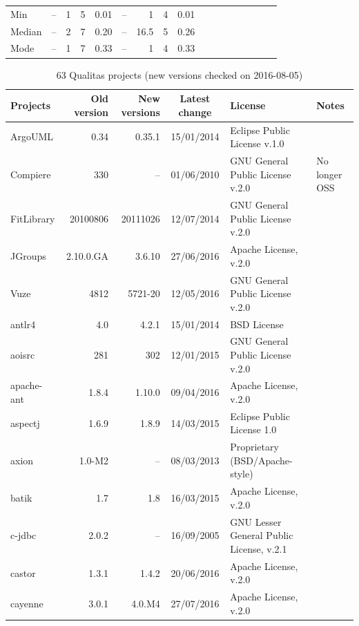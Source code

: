 \documentclass{IEEEtran}
\begin{document}
\begin{table}[h]
{\begin{tabular}{l|r|r|r|r|r|r|r|r|r|r|r|r|r|r|r|r}
			Min 	& -- 	& 1 	& 5 	& 0.01 	& -- 	& 1 		& 4 	& 0.01 \\ %
			Median 	& -- 	& 2 	& 7 	& 0.20 	& -- 	& 16.5 		& 5 	& 0.26 \\ %
			Mode 	& -- 	& 1 	& 7 	& 0.33 	& -- 	& 1 		& 4 	& 0.33 \\ %
			\hline
		\end{tabular} %
	}
\end{table}

\begin{table}[H]
	\centering
	\caption{63 Qualitas projects (new versions checked on 2016-08-05)}
	\label{t:new_and_old}
\begin{tabular}{l|r|r|c|p{5cm}|p{3cm}}
	\hline 
	Projects & Old version & New versions & Latest change & License & Notes \\
	\hline
	ArgoUML & 0.34 & 0.35.1 & 15/01/2014 & Eclipse Public License v.1.0 & \\
	Compiere & 330 & -- & 01/06/2010 &  GNU General Public License v.2.0 & No longer OSS \\
	FitLibrary & 20100806 & 20111026 & 12/07/2014 & GNU General Public License v.2.0 & \\
	JGroups & 2.10.0.GA & 3.6.10 & 27/06/2016  & Apache License, v.2.0 & \\
	Vuze & 4812 & 5721-20 & 12/05/2016 & GNU General Public License v.2.0 &  \\
	antlr4 & 4.0 & 4.2.1 & 15/01/2014 & BSD License & \\
	aoisrc & 281 & 302 & 12/01/2015 &  GNU General Public License v.2.0 & \\
	apache-ant & 1.8.4 & 1.10.0 & 09/04/2016 & Apache License, v.2.0 & \\
	aspectj & 1.6.9 & 1.8.9 & 14/03/2015 & Eclipse Public License 1.0 & \\
	axion & 1.0-M2 & -- & 08/03/2013 & Proprietary (BSD/Apache-style) & \\
	batik & 1.7 & 1.8 & 16/03/2015 & Apache License, v.2.0 & \\
	c-jdbc & 2.0.2 & -- & 16/09/2005 & GNU Lesser General Public License, v.2.1 & \\
	castor & 1.3.1 & 1.4.2 & 20/06/2016 & Apache License, v.2.0 & \\
	cayenne & 3.0.1 & 4.0.M4 &  27/07/2016 & Apache License, v.2.0 & \\

\end{tabular}
\end{table}
\end{document}
